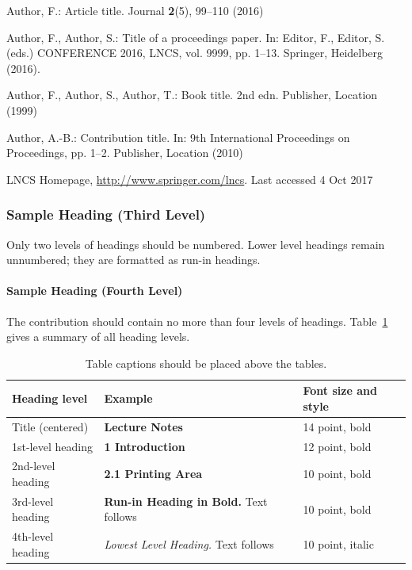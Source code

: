 \documentclass[runningheads]{llncs}
\begin{document}
%
%
% 
% 
%
\begin{thebibliography}{8}
Author, F.: Article title. Journal \textbf{2}(5), 99--110 (2016)

Author, F., Author, S.: Title of a proceedings paper. In: Editor,
F., Editor, S. (eds.) CONFERENCE 2016, LNCS, vol. 9999, pp. 1--13.
Springer, Heidelberg (2016). 

Author, F., Author, S., Author, T.: Book title. 2nd edn. Publisher,
Location (1999)

Author, A.-B.: Contribution title. In: 9th International Proceedings
on Proceedings, pp. 1--2. Publisher, Location (2010)

LNCS Homepage, \url{http://www.springer.com/lncs}. Last accessed 4
Oct 2017
\end{thebibliography}




\subsubsection{Sample Heading (Third Level)} Only two levels of
headings should be numbered. Lower level headings remain unnumbered;
they are formatted as run-in headings.

\paragraph{Sample Heading (Fourth Level)}
The contribution should contain no more than four levels of
headings. Table~\ref{tab1} gives a summary of all heading levels.

\begin{table}
\caption{Table captions should be placed above the
tables.}\label{tab1}
\begin{tabular}{|l|l|l|}
\hline
Heading level &  Example & Font size and style\\
\hline
Title (centered) &  {\Large\bfseries Lecture Notes} & 14 point, bold\\
1st-level heading &  {\large\bfseries 1 Introduction} & 12 point, bold\\
2nd-level heading & {\bfseries 2.1 Printing Area} & 10 point, bold\\
3rd-level heading & {\bfseries Run-in Heading in Bold.} Text follows & 10 point, bold\\
4th-level heading & {\itshape Lowest Level Heading.} Text follows & 10 point, italic\\
\hline
\end{tabular}
\end{table}
\end{document}
